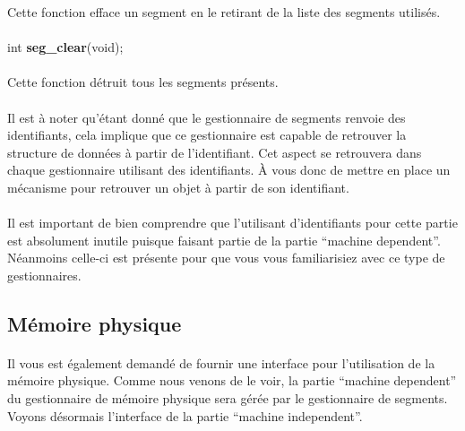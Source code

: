 \documentclass[10pt,a4wide]{article}
\begin{document}
Cette fonction efface un segment en le retirant de la liste des segments
utilis\'es.

\paragraph{}

\hspace{1.5cm}int \textbf{seg\_clear}(void);

\paragraph{}

Cette fonction d\'etruit tous les segments pr\'esents.

\paragraph{}

Il est \`a noter qu'\'etant donn\'e que le gestionnaire de segments
renvoie des identifiants, cela implique que ce gestionnaire est capable
de retrouver la structure de donn\'ees \`a partir de l'identifiant. Cet aspect
se retrouvera dans chaque gestionnaire utilisant des identifiants. \`A vous
donc de mettre en place un m\'ecanisme pour retrouver un objet \`a partir
de son identifiant.

\paragraph{}

Il est important de bien comprendre que l'utilisant d'identifiants pour cette
partie est absolument inutile puisque faisant partie de la partie ``machine
dependent''. N\'eanmoins celle-ci est pr\'esente pour que vous vous
familiarisiez avec ce type de gestionnaires.

\subsection{M\'emoire physique}

\paragraph{}

Il vous est \'egalement demand\'e de fournir une interface pour
l'utilisation de la m\'emoire physique. Comme nous venons de le voir,
la partie ``machine dependent'' du gestionnaire de m\'emoire physique
sera g\'er\'ee par le gestionnaire de segments. Voyons d\'esormais
l'interface de la partie ``machine independent''.
\end{document}
